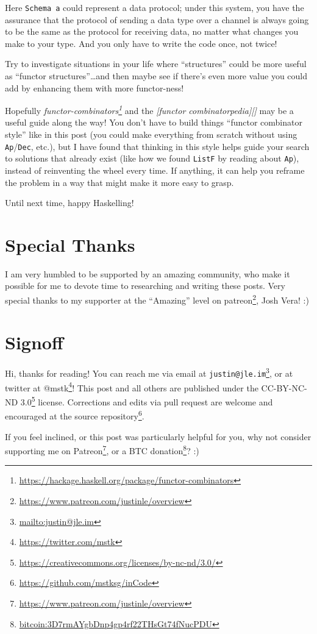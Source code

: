 \documentclass[]{article}
\renewcommand{\href}[2]{#2\footnote{\url{#1}}}
\begin{document}
Here \texttt{Schema\ a} could represent a data protocol; under this system, you
have the assurance that the protocol of sending a data type over a channel is
always going to be the same as the protocol for receiving data, no matter what
changes you make to your type. And you only have to write the code once, not
twice!

Try to investigate situations in your life where ``structures'' could be more
useful as ``functor structures''\ldots and then maybe see if there's even more
value you could add by enhancing them with more functor-ness!

Hopefully
\emph{\href{https://hackage.haskell.org/package/functor-combinators}{functor-combinators}}
and the \emph{{[}functor combinatorpedia{]}{[}{]}} may be a useful guide along
the way! You don't have to build things ``functor combinator style'' like in
this post (you could make everything from scratch without using
\texttt{Ap}/\texttt{Dec}, etc.), but I have found that thinking in this style
helps guide your search to solutions that already exist (like how we found
\texttt{ListF} by reading about \texttt{Ap}), instead of reinventing the wheel
every time. If anything, it can help you reframe the problem in a way that might
make it more easy to grasp.

Until next time, happy Haskelling!

\section{Special Thanks}\label{special-thanks}

I am very humbled to be supported by an amazing community, who make it possible
for me to devote time to researching and writing these posts. Very special
thanks to my supporter at the ``Amazing'' level on
\href{https://www.patreon.com/justinle/overview}{patreon}, Josh Vera! :)

\section{Signoff}\label{signoff}

Hi, thanks for reading! You can reach me via email at
\href{mailto:justin@jle.im}{\nolinkurl{justin@jle.im}}, or at twitter at
\href{https://twitter.com/mstk}{@mstk}! This post and all others are published
under the \href{https://creativecommons.org/licenses/by-nc-nd/3.0/}{CC-BY-NC-ND
3.0} license. Corrections and edits via pull request are welcome and encouraged
at \href{https://github.com/mstksg/inCode}{the source repository}.

If you feel inclined, or this post was particularly helpful for you, why not
consider \href{https://www.patreon.com/justinle/overview}{supporting me on
Patreon}, or a \href{bitcoin:3D7rmAYgbDnp4gp4rf22THsGt74fNucPDU}{BTC donation}?
:)
\end{document}

